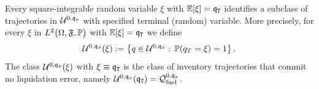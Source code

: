 \documentclass[10pt,a4paper]{article}
\begin{document}
	
	Every square-integrable random variable $\xi$ with $\mathbb{{E}}[\xi] = \mathfrak{q}_{\mathtt{T} }$ identifies a subclass of trajectories in $\mathcal{U}^{0,\mathfrak{q_0}}$ with specified terminal (random) variable. More precisely, for every $\xi$ in $L^2\big(\Omega,\mathfrak{F}, {\mathbb{P}} \big)$ with  $\mathbb{{E}}[\xi] = \mathfrak{q}_{\mathtt{T} }$  we define 
	\begin{equation*}
	\mathcal{U}^{0,\mathfrak{q_0}}(\xi) := \left\lbrace
	q \in \mathcal{U}^{0,\mathfrak{q_0}} : \, {\mathbb{P}}(q_T=\xi)=1 
	\right\rbrace.
	\end{equation*}
	The class $\mathcal{U}^{0,\mathfrak{q_0}}(\xi)$ with $\xi \equiv \mathfrak{q}_{\mathtt{T} }$ is the class of inventory trajectories that commit no liquidation error, namely $\mathcal{U}^{0,\mathfrak{q_0}}(\mathfrak{q}_{\mathtt{T} }) = \mathcal{Q}_{\text{fuel}}^{0,\mathfrak{q_0}}$. 
	
\end{document}
